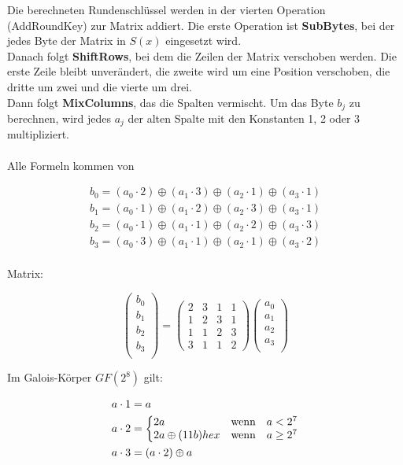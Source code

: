 Die berechneten Rundenschlüssel werden in der vierten Operation (AddRoundKey) zur Matrix addiert. Die erste Operation ist \textbf{SubBytes}, bei der jedes Byte der Matrix in \(S(x)\) eingesetzt wird.\\ 
Danach folgt \textbf{ShiftRows}, bei dem die Zeilen der Matrix verschoben werden. Die erste Zeile bleibt unverändert, die zweite wird um eine Position verschoben, die dritte um zwei und die vierte um drei.\\ 
Dann folgt \textbf{MixColumns}, das die Spalten vermischt. Um das Byte \(b_j\) zu berechnen, wird jedes \(a_j\) der alten Spalte mit den Konstanten 1, 2 oder 3 multipliziert.\\\\

Alle Formeln kommen von \cite{AdvancedEncryptionStandard2026}

\begin{align}
b_0 = (a_0\cdot2)\oplus(a_1\cdot3)\oplus(a_2\cdot1)\oplus(a_3\cdot1)\\
b_1 = (a_0\cdot1)\oplus(a_1\cdot2)\oplus(a_2\cdot3)\oplus(a_3\cdot1)\\
b_2 = (a_0\cdot1)\oplus(a_1\cdot1)\oplus(a_2\cdot2)\oplus(a_3\cdot3)\\
b_3 = (a_0\cdot3)\oplus(a_1\cdot1)\oplus(a_2\cdot1)\oplus(a_3\cdot2)\\
\end{align}

Matrix:

\[\begin{pmatrix}
b_0\\ b_1\\ b_2\\ b_3 \\ 
\end{pmatrix}=
\begin{pmatrix}
2 & 3 & 1 & 1\\ 
1 & 2 & 3 & 1\\ 
1 & 1 & 2 & 3\\  
3 & 1 & 1 & 2 
\end{pmatrix}\begin{pmatrix}
a_0\\ a_1\\ a_2\\ a_3 \\ 
\end{pmatrix}\]

Im Galois-Körper \(GF(2^8)\) gilt:

\begin{align}
&a\cdot1=a\\
&a\cdot2=\left\{ \begin{array}{@{}lcl@{}}
2a & \mbox{wenn} & a < 2^7\\
2a\oplus(11b)\small{hex} & \mbox{wenn} & a \geq 2^7\\
\end{array}\right.\\
&a\cdot3=(a\cdot2)\oplus a
\end{align}

